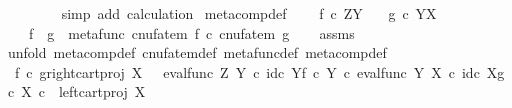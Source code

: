 \begin{isabellebody}
\ \ \ \ \ \ \isamarkupfalse%
\ {\isacharparenleft}{\kern0pt}simp\ add{\isacharcolon}{\kern0pt}\ calculation{\isacharparenright}{\kern0pt}\isanewline
{}\isamarkupfalse%
%
\endisatagproof
{\isafoldproof}%
%
\isadelimproof
\isanewline
%
\endisadelimproof
\isanewline
{}\isamarkupfalse%
\ meta{\isacharunderscore}{\kern0pt}comp{}{\isacharunderscore}{\kern0pt}def{}{\isacharcolon}{\kern0pt}\ \isanewline
\ \ \ {\isachardoublequoteopen}f\ {\isasymin}\isactrlsub c\ Z\isactrlbsup Y\isactrlesup {\isachardoublequoteclose}\isanewline
\ \ \ {\isachardoublequoteopen}g\ {\isasymin}\isactrlsub c\ Y\isactrlbsup X\isactrlesup {\isachardoublequoteclose}\isanewline
\ \ \ {\isachardoublequoteopen}f\ {\isasymbox}\ g\ {\isacharequal}{\kern0pt}\ metafunc\ {\isacharparenleft}{\kern0pt}{\isacharparenleft}{\kern0pt}cnufatem\ f{\isacharparenright}{\kern0pt}\ {\isasymcirc}\isactrlsub c\ {\isacharparenleft}{\kern0pt}cnufatem\ g{\isacharparenright}{\kern0pt}{\isacharparenright}{\kern0pt}{\isachardoublequoteclose}\isanewline
%
\isadelimproof
\ \ %
\endisadelimproof
%
\isatagproof
{}\isamarkupfalse%
\ assms\isanewline
{}\isamarkupfalse%
{\isacharparenleft}{\kern0pt}unfold\ meta{\isacharunderscore}{\kern0pt}comp{}{\isacharunderscore}{\kern0pt}def{}\ cnufatem{\isacharunderscore}{\kern0pt}def{}\ metafunc{\isacharunderscore}{\kern0pt}def\ meta{\isacharunderscore}{\kern0pt}comp{\isacharunderscore}{\kern0pt}def{\isacharparenright}{\kern0pt}\ \ \ \ \ \ \ \ \ \ \isanewline
\ \ \isamarkupfalse%
\ {\isachardoublequoteopen}f\isactrlsup {\isasymflat}\ {\isasymcirc}\isactrlsub c\ {\isasymlangle}g\isactrlsup {\isasymflat}{\isacharcomma}{\kern0pt}right{\isacharunderscore}{\kern0pt}cart{\isacharunderscore}{\kern0pt}proj\ X\ {\isasymone}{\isasymrangle}\ {\isacharequal}{\kern0pt}\ {\isacharparenleft}{\kern0pt}{\isacharparenleft}{\kern0pt}eval{\isacharunderscore}{\kern0pt}func\ Z\ Y\ {\isasymcirc}\isactrlsub c\ {\isasymlangle}id\isactrlsub c\ Y{\isacharcomma}{\kern0pt}f\ {\isasymcirc}\isactrlsub c\ {\isasymbeta}\isactrlbsub Y\isactrlesub {\isasymrangle}{\isacharparenright}{\kern0pt}\ {\isasymcirc}\isactrlsub c\ eval{\isacharunderscore}{\kern0pt}func\ Y\ X\ {\isasymcirc}\isactrlsub c\ {\isasymlangle}id\isactrlsub c\ X{\isacharcomma}{\kern0pt}g\ {\isasymcirc}\isactrlsub c\ {\isasymbeta}\isactrlbsub X\isactrlesub {\isasymrangle}{\isacharparenright}{\kern0pt}\ {\isasymcirc}\isactrlsub c\ \ left{\isacharunderscore}{\kern0pt}cart{\isacharunderscore}{\kern0pt}proj\ X\ {\isasymone}{\isachardoublequoteclose}\isanewline

\end{isabellebody}
